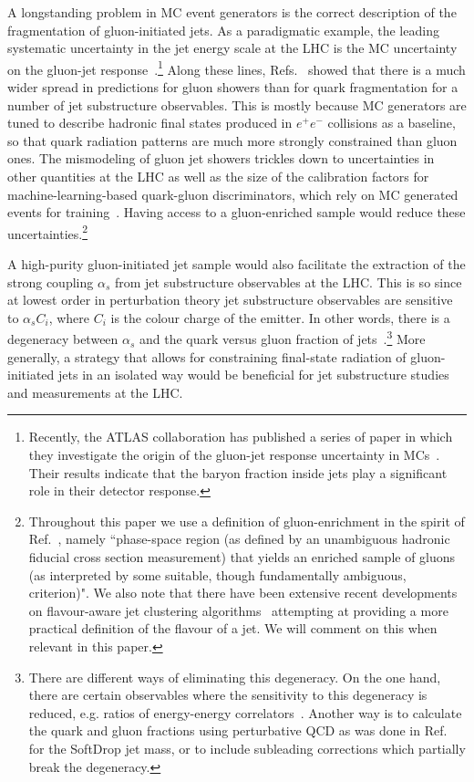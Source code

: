 \documentclass[a4paper,11pt]{article}
\begin{document}
A longstanding problem in MC event generators is the correct description of the fragmentation of gluon-initiated jets. As a paradigmatic example, the leading systematic uncertainty in the jet energy scale at the LHC is the MC uncertainty on the gluon-jet response~\cite{ATLAS:2020cli,CMS:2016lmd, CMS-DP-2020-019}.\footnote{Recently, the ATLAS collaboration has published a series of paper in which they investigate the origin of the gluon-jet response uncertainty in MCs~\cite{ATL-PHYS-PUB-2022-021,ATLAS:2024kkj, ATLAS:2024png}. Their results indicate that the baryon fraction inside jets play a significant role in their detector response.}  Along these lines, Refs.~\cite{Andersen:2016qtm, Gras:2017jty} showed that there is a much wider spread in predictions for gluon showers than for quark fragmentation for a number of jet substructure observables. This is mostly because MC generators are tuned to describe hadronic final states produced in $e^+e^-$ collisions as a baseline, so that quark radiation patterns are much more strongly constrained than gluon ones. The mismodeling of gluon jet showers trickles down to uncertainties in other quantities at the LHC as well as the size of the calibration factors for machine-learning-based quark-gluon discriminators, which rely on MC generated events for training~\cite{ATLAS:2014vax}. Having access to a gluon-enriched sample would reduce these uncertainties.\footnote{Throughout this paper we use a definition of gluon-enrichment in the spirit of Ref.~\cite{Andersen:2016qtm, Gras:2017jty}, namely ``phase-space region (as defined by an unambiguous hadronic fiducial cross section measurement) that yields an enriched sample of gluons (as interpreted by some suitable, though fundamentally ambiguous, criterion)". We also note that there have been extensive recent developments on flavour-aware jet clustering algorithms~\cite{Caletti:2022hnc,Czakon:2022wam,Gauld:2022lem} attempting at providing a more practical definition of the flavour of a jet. We will comment on this when relevant in this paper.}

A high-purity gluon-initiated jet sample would also facilitate the extraction of the strong coupling $\alpha_s$ from jet substructure observables at the LHC. This is so since at lowest order in perturbation theory jet substructure observables are sensitive to $\alpha_s C_i$, where $C_i$ is the colour charge of the emitter. In other words, there is a degeneracy between $\alpha_s$ and the quark versus gluon fraction of jets~\cite{Proceedings:2018jsb}.\footnote{There are different ways of eliminating this degeneracy. On the one hand, there are certain observables where the sensitivity to this degeneracy is reduced, e.g. ratios of energy-energy correlators~\cite{Chen:2020vvp,Chen:2024nyc,CMS:2024mlf,Lee:2024esz}. Another way is to calculate the quark and gluon fractions using perturbative QCD as was done in Ref.~\cite{Hannesdottir:2022rsl} for the SoftDrop jet mass, or to include subleading corrections which partially break the degeneracy.} More generally, a strategy that allows for constraining final-state radiation of gluon-initiated jets in an isolated way would be beneficial for jet substructure studies and measurements at the LHC.
\end{document}
